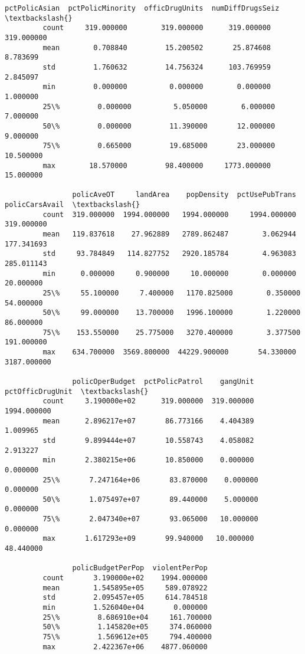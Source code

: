 \documentclass[11pt]{llncs}
\begin{document}
\begin{Verbatim}[commandchars=\\\{\}]
                pctPolicAsian  pctPolicMinority  officDrugUnits  numDiffDrugsSeiz  \textbackslash{}
         count     319.000000        319.000000      319.000000        319.000000   
         mean        0.708840         15.200502       25.874608          8.783699   
         std         1.760632         14.756324      103.769959          2.845097   
         min         0.000000          0.000000        0.000000          1.000000   
         25\%         0.000000          5.050000        6.000000          7.000000   
         50\%         0.000000         11.390000       12.000000          9.000000   
         75\%         0.665000         19.685000       23.000000         10.500000   
         max        18.570000         98.400000     1773.000000         15.000000   
         
                policAveOT     landArea    popDensity  pctUsePubTrans  policCarsAvail  \textbackslash{}
         count  319.000000  1994.000000   1994.000000     1994.000000      319.000000   
         mean   119.837618    27.962889   2789.862487        3.062944      177.341693   
         std     93.784849   114.827752   2920.185784        4.963083      285.011143   
         min      0.000000     0.900000     10.000000        0.000000       20.000000   
         25\%     55.100000     7.400000   1170.825000        0.350000       54.000000   
         50\%     99.000000    13.700000   1996.100000        1.220000       86.000000   
         75\%    153.550000    25.775000   3270.400000        3.377500      191.000000   
         max    634.700000  3569.800000  44229.900000       54.330000     3187.000000   
         
                policOperBudget  pctPolicPatrol    gangUnit  pctOfficDrugUnit  \textbackslash{}
         count     3.190000e+02      319.000000  319.000000       1994.000000   
         mean      2.896217e+07       86.773166    4.404389          1.009965   
         std       9.899444e+07       10.558743    4.058082          2.913227   
         min       2.380215e+06       10.850000    0.000000          0.000000   
         25\%       7.247164e+06       83.870000    0.000000          0.000000   
         50\%       1.075497e+07       89.440000    5.000000          0.000000   
         75\%       2.047340e+07       93.065000   10.000000          0.000000   
         max       1.617293e+09       99.940000   10.000000         48.440000   
         
                policBudgetPerPop  violentPerPop  
         count       3.190000e+02    1994.000000  
         mean        1.545895e+05     589.078922  
         std         2.095457e+05     614.784518  
         min         1.526040e+04       0.000000  
         25\%         8.686910e+04     161.700000  
         50\%         1.145820e+05     374.060000  
         75\%         1.569612e+05     794.400000  
         max         2.422367e+06    4877.060000  
\end{Verbatim}
            
\end{document}
